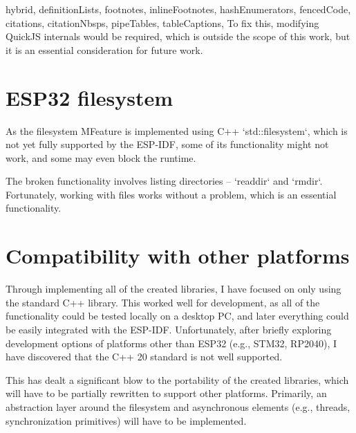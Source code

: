 \begin{markdown*}{%
  hybrid,
  definitionLists,
  footnotes,
  inlineFootnotes,
  hashEnumerators,
  fencedCode,
  citations,
  citationNbsps,
  pipeTables,
  tableCaptions,
}
To fix this, modifying QuickJS internals would be required, which is outside the scope of this work, but it is an essential consideration for future work.


\section{ESP32 filesystem}

As the filesystem MFeature is implemented using C++ `std::filesystem`, which is not yet fully supported by the ESP-IDF, some of its functionality might not work, and some may even block the runtime.

The broken functionality involves listing directories -- `readdir` and `rmdir`. Fortunately, working with files works without a problem, which is an essential functionality.


\section{Compatibility with other platforms}

Through implementing all of the created libraries, I have focused on only using the standard C++ library. This worked well for development, as all of the functionality could be tested locally on a desktop PC, and later everything could be easily integrated with the ESP-IDF. Unfortunately, after briefly exploring development options of platforms other than ESP32 (e.g., STM32, RP2040), I have discovered that the C++ 20 standard is not well supported.

This has dealt a significant blow to the portability of the created libraries, which will have to be partially rewritten to support other platforms. Primarily, an abstraction layer around the filesystem and asynchronous elements (e.g., threads, synchronization primitives) will have to be implemented.


\end{markdown*}